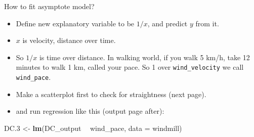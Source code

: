 \documentclass[ignorenonframetext,]{beamer}
\newenvironment{Shaded}{\begin{snugshade}}{\end{snugshade}}
\newcommand{\DataTypeTok}[1]{\textcolor[rgb]{0.13,0.29,0.53}{#1}}
\newcommand{\DecValTok}[1]{\textcolor[rgb]{0.00,0.00,0.81}{#1}}
\newcommand{\FloatTok}[1]{\textcolor[rgb]{0.00,0.00,0.81}{#1}}
\newcommand{\KeywordTok}[1]{\textcolor[rgb]{0.13,0.29,0.53}{\textbf{#1}}}
\newcommand{\NormalTok}[1]{#1}
\newcommand{\OperatorTok}[1]{\textcolor[rgb]{0.81,0.36,0.00}{\textbf{#1}}}
\newcommand{\StringTok}[1]{\textcolor[rgb]{0.31,0.60,0.02}{#1}}
\providecommand{\tightlist}{%
  \setlength{\itemsep}{0pt}\setlength{\parskip}{0pt}}
\begin{document}
\begin{frame}[fragile]{How to fit asymptote model?}
\protect\hypertarget{how-to-fit-asymptote-model}{}

\begin{itemize}
\tightlist
\item
  Define new explanatory variable to be \(1/x\), and predict \(y\) from
  it.
\item
  \(x\) is velocity, distance over time.
\item
  So \(1/x\) is time over distance. In walking world, if you walk 5
  km/h, take 12 minutes to walk 1 km, called your pace. So 1 over
  \texttt{wind\_velocity} we call \texttt{wind\_pace}.
\item
  Make a scatterplot first to check for straightness (next page).
\end{itemize}

\begin{Shaded}
\end{Shaded}

\begin{itemize}
\tightlist
\item
  and run regression like this (output page after):
\end{itemize}

\begin{Shaded}
\begin{Highlighting}[]
\NormalTok{DC}\FloatTok{.3}\NormalTok{ <-}\StringTok{ }\KeywordTok{lm}\NormalTok{(DC_output }\OperatorTok{~}\StringTok{ }\NormalTok{wind_pace, }\DataTypeTok{data =}\NormalTok{ windmill)}
\end{Highlighting}
\end{Shaded}

\end{frame}
\end{document}
